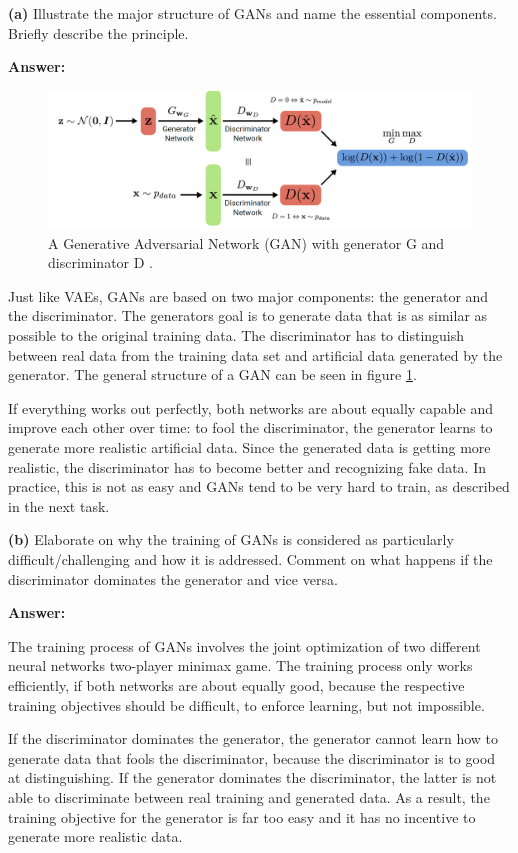 \textbf{(a)} Illustrate the major structure of GANs and name the essential components. Briefly describe the principle. 

\textbf{Answer:}

\begin{figure}
	\centering
	\includegraphics[width=0.8\linewidth]{gan}
	\caption{A Generative Adversarial Network (GAN) with generator G and discriminator D \cite[10, L. 12]{geiger20}.}
	\label{img:gan}
\end{figure}

Just like VAEs, GANs are based on two major components: the generator and the discriminator. The generators goal is to generate data that is as similar as possible to the original training data. The discriminator has to distinguish between real data from the training data set and artificial data generated by the generator. The general structure of a GAN can be seen in figure \ref{img:gan}.

If everything works out perfectly, both networks are about equally capable and improve each other over time: to fool the discriminator, the generator learns to generate more realistic artificial data. Since the generated data is getting more realistic, the discriminator has to become better and recognizing fake data. In practice, this is not as easy and GANs tend to be very hard to train, as described in the next task.


\textbf{(b)} Elaborate on why the training of GANs is considered as particularly difficult/challenging and how it is addressed. Comment on what happens if the discriminator dominates the generator and vice versa.

\textbf{Answer:}

The training process of GANs involves the joint optimization of two different neural networks two-player minimax game. The training process only works efficiently, if both networks are about equally good, because the respective training objectives should be difficult, to enforce learning, but not impossible.

If the discriminator dominates the generator, the generator cannot learn how to generate data that fools the discriminator, because the discriminator is to good at distinguishing. If the generator dominates the discriminator, the latter is not able to discriminate between real training and generated data. As a result, the training objective for the generator is far too easy and it has no incentive to generate more realistic data.

